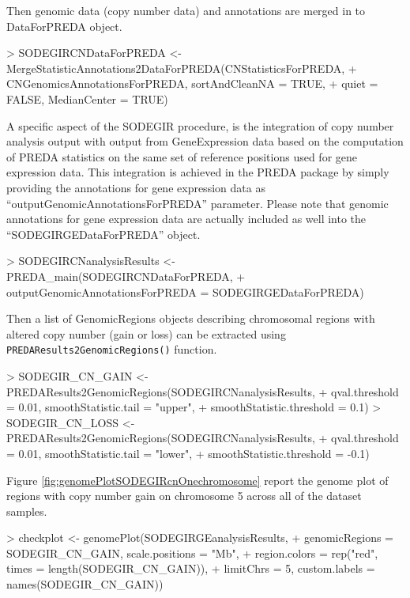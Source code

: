 \documentclass[a4paper,10pt]{article}
\begin{document}
Then genomic data (copy number data) and annotations are merged in to DataForPREDA object.

\begin{Schunk}
\begin{Sinput}
> SODEGIRCNDataForPREDA <- MergeStatisticAnnotations2DataForPREDA(CNStatisticsForPREDA, 
+     CNGenomicsAnnotationsForPREDA, sortAndCleanNA = TRUE, 
+     quiet = FALSE, MedianCenter = TRUE)
\end{Sinput}
\end{Schunk}

A specific aspect of the SODEGIR procedure, is the integration of copy number analysis output with output from GeneExpression data based on the computation of PREDA statistics on the same set of reference positions used for gene expression data. This integration is achieved in the PREDA package by simply providing the annotations for gene expression data as ``outputGenomicAnnotationsForPREDA'' parameter. Please note that genomic annotations for gene expression data are actually included as well into the ``SODEGIRGEDataForPREDA'' object.

\begin{Schunk}
\begin{Sinput}
> SODEGIRCNanalysisResults <- PREDA_main(SODEGIRCNDataForPREDA, 
+     outputGenomicAnnotationsForPREDA = SODEGIRGEDataForPREDA)
\end{Sinput}
\end{Schunk}


Then a list of GenomicRegions objects describing chromosomal regions with altered copy number (gain or loss) can be extracted using \texttt{PREDAResults2GenomicRegions()} function.

\begin{Schunk}
\begin{Sinput}
> SODEGIR_CN_GAIN <- PREDAResults2GenomicRegions(SODEGIRCNanalysisResults, 
+     qval.threshold = 0.01, smoothStatistic.tail = "upper", 
+     smoothStatistic.threshold = 0.1)
> SODEGIR_CN_LOSS <- PREDAResults2GenomicRegions(SODEGIRCNanalysisResults, 
+     qval.threshold = 0.01, smoothStatistic.tail = "lower", 
+     smoothStatistic.threshold = -0.1)
\end{Sinput}
\end{Schunk}

Figure \ref{fig:genomePlotSODEGIRcnOnechromosome} report the genome plot of regions with copy number gain on chromosome 5 across all of the dataset samples.

\begin{Schunk}
\begin{Sinput}
> checkplot <- genomePlot(SODEGIRGEanalysisResults, 
+     genomicRegions = SODEGIR_CN_GAIN, scale.positions = "Mb", 
+     region.colors = rep("red", times = length(SODEGIR_CN_GAIN)), 
+     limitChrs = 5, custom.labels = names(SODEGIR_CN_GAIN))
\end{Sinput}
\end{Schunk}
\end{document}
